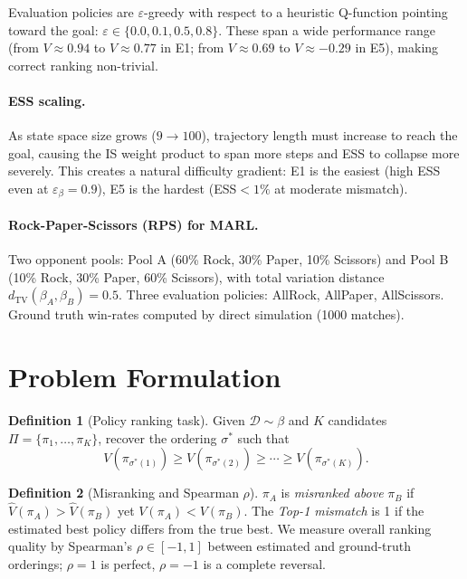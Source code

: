 \documentclass[10pt]{article}
\theoremstyle{plain}
\theoremstyle{definition}
\newtheorem{definition}{Definition}
\theoremstyle{remark}
\newcommand{\TV}{d_{\mathrm{TV}}}
\newcommand{\piA}{\pi_A}
\newcommand{\piB}{\pi_B}
\newcommand{\Vhat}{\hat{V}}
\newcommand{\calD}{\mathcal{D}}
\begin{document}
Evaluation policies are $\varepsilon$-greedy with respect to a heuristic
Q-function pointing toward the goal: $\varepsilon \in \{0.0,0.1,0.5,0.8\}$.
These span a wide performance range (from $V\approx 0.94$ to $V\approx 0.77$
in E1; from $V\approx 0.69$ to $V\approx -0.29$ in E5), making correct ranking
non-trivial.

\paragraph{ESS scaling.}  As state space size grows ($9\to100$), trajectory
length must increase to reach the goal, causing the IS weight product to span
more steps and ESS to collapse more severely.  This creates a natural
difficulty gradient: E1 is the easiest (high ESS even at $\varepsilon_\beta=0.9$),
E5 is the hardest (ESS$<1\%$ at moderate mismatch).

\paragraph{Rock-Paper-Scissors (RPS) for MARL.}
Two opponent pools: Pool A (60\% Rock, 30\% Paper, 10\% Scissors) and
Pool B (10\% Rock, 30\% Paper, 60\% Scissors), with total variation distance
$\TV(\beta_A,\beta_B)=0.5$.  Three evaluation policies: AllRock, AllPaper,
AllScissors.  Ground truth win-rates computed by direct simulation (1000 matches).

\section{Problem Formulation}
\label{sec:problem}

\begin{definition}[Policy ranking task]
  Given $\calD\sim\beta$ and $K$ candidates $\Pi=\{\pi_1,\ldots,\pi_K\}$,
  recover the ordering $\sigma^*$ such that
  \[V(\pi_{\sigma^*(1)}) \geq V(\pi_{\sigma^*(2)}) \geq \cdots \geq V(\pi_{\sigma^*(K)}).\]
\end{definition}

\begin{definition}[Misranking and Spearman $\rho$]
  $\piA$ is \emph{misranked above} $\piB$ if $\Vhat(\piA)>\Vhat(\piB)$ yet
  $V(\piA)<V(\piB)$.  The \emph{Top-1 mismatch} is 1 if the estimated best
  policy differs from the true best.  We measure overall ranking quality by
  Spearman's $\rho\in[-1,1]$ between estimated and ground-truth orderings;
  $\rho=1$ is perfect, $\rho=-1$ is a complete reversal.
\end{definition}
\end{document}
